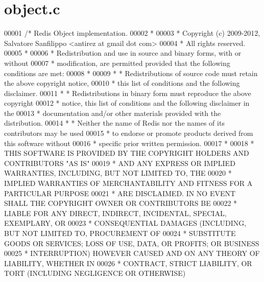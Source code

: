 \hypertarget{object_8c_source}{}\section{object.\+c}
\label{object_8c_source}

\begin{DoxyCode}
00001 \textcolor{comment}{/* Redis Object implementation.}
00002 \textcolor{comment}{ *}
00003 \textcolor{comment}{ * Copyright (c) 2009-2012, Salvatore Sanfilippo <antirez at gmail dot com>}
00004 \textcolor{comment}{ * All rights reserved.}
00005 \textcolor{comment}{ *}
00006 \textcolor{comment}{ * Redistribution and use in source and binary forms, with or without}
00007 \textcolor{comment}{ * modification, are permitted provided that the following conditions are met:}
00008 \textcolor{comment}{ *}
00009 \textcolor{comment}{ *   * Redistributions of source code must retain the above copyright notice,}
00010 \textcolor{comment}{ *     this list of conditions and the following disclaimer.}
00011 \textcolor{comment}{ *   * Redistributions in binary form must reproduce the above copyright}
00012 \textcolor{comment}{ *     notice, this list of conditions and the following disclaimer in the}
00013 \textcolor{comment}{ *     documentation and/or other materials provided with the distribution.}
00014 \textcolor{comment}{ *   * Neither the name of Redis nor the names of its contributors may be used}
00015 \textcolor{comment}{ *     to endorse or promote products derived from this software without}
00016 \textcolor{comment}{ *     specific prior written permission.}
00017 \textcolor{comment}{ *}
00018 \textcolor{comment}{ * THIS SOFTWARE IS PROVIDED BY THE COPYRIGHT HOLDERS AND CONTRIBUTORS "AS IS"}
00019 \textcolor{comment}{ * AND ANY EXPRESS OR IMPLIED WARRANTIES, INCLUDING, BUT NOT LIMITED TO, THE}
00020 \textcolor{comment}{ * IMPLIED WARRANTIES OF MERCHANTABILITY AND FITNESS FOR A PARTICULAR PURPOSE}
00021 \textcolor{comment}{ * ARE DISCLAIMED. IN NO EVENT SHALL THE COPYRIGHT OWNER OR CONTRIBUTORS BE}
00022 \textcolor{comment}{ * LIABLE FOR ANY DIRECT, INDIRECT, INCIDENTAL, SPECIAL, EXEMPLARY, OR}
00023 \textcolor{comment}{ * CONSEQUENTIAL DAMAGES (INCLUDING, BUT NOT LIMITED TO, PROCUREMENT OF}
00024 \textcolor{comment}{ * SUBSTITUTE GOODS OR SERVICES; LOSS OF USE, DATA, OR PROFITS; OR BUSINESS}
00025 \textcolor{comment}{ * INTERRUPTION) HOWEVER CAUSED AND ON ANY THEORY OF LIABILITY, WHETHER IN}
00026 \textcolor{comment}{ * CONTRACT, STRICT LIABILITY, OR TORT (INCLUDING NEGLIGENCE OR OTHERWISE)}

\end{DoxyCode}
